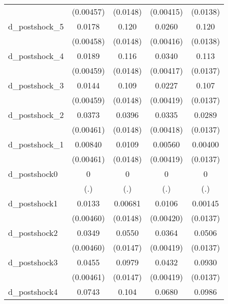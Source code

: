 {\begin{tabular}{l*{4}{c}}
          &(0.00457)         & (0.0148)         &(0.00415)         & (0.0138)         \\
d\_postshock\_5&   0.0178\sym{***}&    0.120\sym{***}&   0.0260\sym{***}&    0.120\sym{***}\\
          &(0.00458)         & (0.0148)         &(0.00416)         & (0.0138)         \\
d\_postshock\_4&   0.0189\sym{***}&    0.116\sym{***}&   0.0340\sym{***}&    0.113\sym{***}\\
          &(0.00459)         & (0.0148)         &(0.00417)         & (0.0137)         \\
d\_postshock\_3&   0.0144\sym{**} &    0.109\sym{***}&   0.0227\sym{***}&    0.107\sym{***}\\
          &(0.00459)         & (0.0148)         &(0.00419)         & (0.0137)         \\
d\_postshock\_2&   0.0373\sym{***}&   0.0396\sym{**} &   0.0335\sym{***}&   0.0289\sym{*}  \\
          &(0.00461)         & (0.0148)         &(0.00418)         & (0.0137)         \\
d\_postshock\_1&  0.00840         &   0.0109         &  0.00560         &  0.00400         \\
          &(0.00461)         & (0.0148)         &(0.00419)         & (0.0137)         \\
d\_postshock0&        0         &        0         &        0         &        0         \\
          &      (.)         &      (.)         &      (.)         &      (.)         \\
d\_postshock1&   0.0133\sym{**} &  0.00681         &   0.0106\sym{*}  &  0.00145         \\
          &(0.00460)         & (0.0148)         &(0.00420)         & (0.0137)         \\
d\_postshock2&   0.0349\sym{***}&   0.0550\sym{***}&   0.0364\sym{***}&   0.0506\sym{***}\\
          &(0.00460)         & (0.0147)         &(0.00419)         & (0.0137)         \\
d\_postshock3&   0.0455\sym{***}&   0.0979\sym{***}&   0.0432\sym{***}&   0.0930\sym{***}\\
          &(0.00461)         & (0.0147)         &(0.00419)         & (0.0137)         \\
d\_postshock4&   0.0743\sym{***}&    0.104\sym{***}&   0.0680\sym{***}&   0.0986\sym{***}\\

\end{tabular}}
